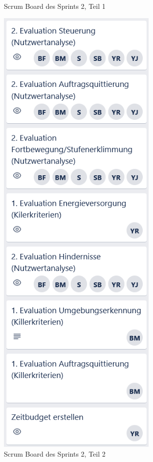 \begin{figure}[H]
\begin{minipage}[t]{0.45\linewidth}
  \caption{Scrum Board des Sprints 2, Teil 1}
  \label{Scrum Board 2.1}
  \end{minipage} 
  \hfill
  \begin{minipage}[t]{0.45\linewidth}
  \includegraphics[width=0.7\textwidth]{img/Trello/Trello-Bord_2_Nr2.PNG}
  \caption{Scrum Board des Sprints 2, Teil 2}
  \label{Scrum Board 2.2}
  \end{minipage}
\end{figure}
    
